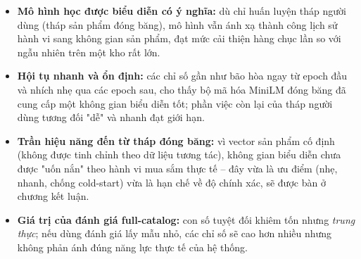 \begin{itemize}[leftmargin=2em, itemsep=2pt]
    \item \textbf{Mô hình học được biểu diễn có ý nghĩa:} dù chỉ huấn luyện tháp
    người dùng (tháp sản phẩm đóng băng), mô hình vẫn ánh xạ thành công lịch sử hành
    vi sang không gian sản phẩm, đạt mức cải thiện hàng chục lần so với ngẫu nhiên
    trên một kho rất lớn.
    \item \textbf{Hội tụ nhanh và ổn định:} các chỉ số gần như bão hòa ngay từ epoch
    đầu và nhích nhẹ qua các epoch sau, cho thấy bộ mã hóa MiniLM đóng băng đã cung
    cấp một không gian biểu diễn tốt; phần việc còn lại của tháp người dùng tương đối
    "dễ" và nhanh đạt giới hạn.
    \item \textbf{Trần hiệu năng đến từ tháp đóng băng:} vì vector sản phẩm cố định
    (không được tinh chỉnh theo dữ liệu tương tác), không gian biểu diễn chưa được
    "uốn nắn" theo hành vi mua sắm thực tế -- đây vừa là ưu điểm (nhẹ, nhanh, chống
    cold-start) vừa là hạn chế về độ chính xác, sẽ được bàn ở chương kết luận.
    \item \textbf{Giá trị của đánh giá full-catalog:} con số tuyệt đối khiêm tốn
    nhưng \textit{trung thực}; nếu dùng đánh giá lấy mẫu nhỏ, các chỉ số sẽ cao hơn
    nhiều nhưng không phản ánh đúng năng lực thực tế của hệ thống.
\end{itemize}
